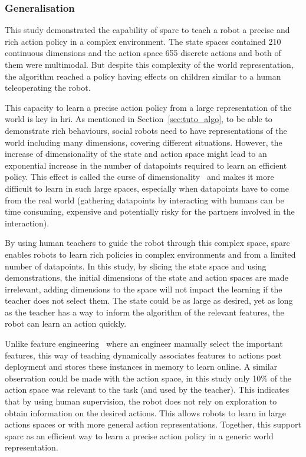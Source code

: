 \subsubsection{Generalisation}


This study demonstrated the capability of \gls{sparc} to teach a robot a precise and rich action policy in a complex environment. The state spaces contained 210 continuous dimensions and the action space 655 discrete actions and both of them were multimodal. But despite this complexity of the world representation, the algorithm reached a policy having effects on children similar to a human teleoperating the robot. 

This capacity to learn a precise action policy from a large representation of the world is key in \gls{hri}. As mentioned in Section~\ref{sec:tuto_algo}, to be able to demonstrate rich behaviours, social robots need to have representations of the world including many dimensions, covering different situations. However, the increase of dimensionality of the state and action space might lead to an exponential increase in the number of datapoints required to learn an efficient policy. This effect is called the curse of dimensionality~\citep{bellman1957dynamic} and makes it more difficult to learn in such large spaces, especially when datapoints have to come from the real world (gathering datapoints by interacting with humans can be time consuming, expensive and potentially risky for the partners involved in the interaction).

By using human teachers to guide the robot through this complex space, \gls{sparc} enables robots to learn rich policies in complex environments and from a limited number of datapoints. In this study, by slicing the state space and using demonstrations, the initial dimensions of the state and action spaces are made irrelevant, adding dimensions to the space will not impact the learning if the teacher does not select them. The state could be as large as desired, yet as long as the teacher has a way to inform the algorithm of the relevant features, the robot can learn an action quickly. 

Unlike feature engineering~\cite{domingos2012few} where an engineer manually select the important features, this way of teaching dynamically associates features to actions post deployment and stores these instances in memory to learn online. A similar observation could be made with the action space, in this study only 10\% of the action space was relevant to the task (and used by the teacher). This indicates that by using human supervision, the robot does not rely on exploration to obtain information on the desired actions. This allows robots to learn in large actions spaces or with more general action representations. Together, this support \gls{sparc} as an efficient way to learn a precise action policy in a generic world representation.

